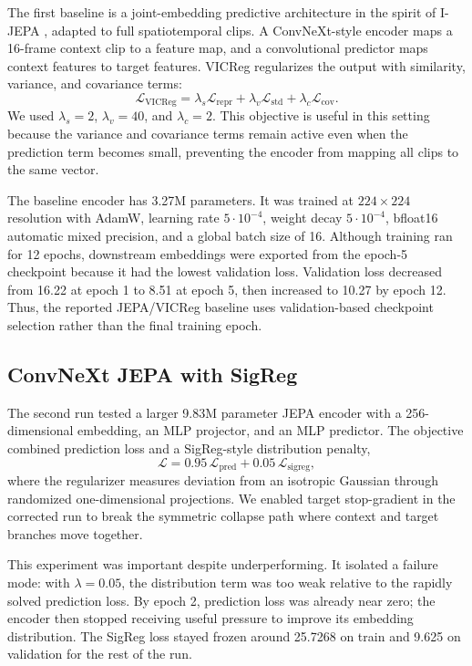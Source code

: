\documentclass{article}
\begin{document}
The first baseline is a joint-embedding predictive architecture in the spirit of I-JEPA \citep{assran2023ijepa}, adapted to full spatiotemporal clips. A ConvNeXt-style encoder maps a 16-frame context clip to a feature map, and a convolutional predictor maps context features to target features. VICReg regularizes the output with similarity, variance, and covariance terms:
\begin{equation}
  \mathcal{L}_{\mathrm{VICReg}}
  = \lambda_s \mathcal{L}_{\mathrm{repr}}
  + \lambda_v \mathcal{L}_{\mathrm{std}}
  + \lambda_c \mathcal{L}_{\mathrm{cov}}.
\end{equation}
We used $\lambda_s=2$, $\lambda_v=40$, and $\lambda_c=2$. This objective is useful in this setting because the variance and covariance terms remain active even when the prediction term becomes small, preventing the encoder from mapping all clips to the same vector.

The baseline encoder has 3.27M parameters. It was trained at $224\times224$ resolution with AdamW, learning rate $5\cdot 10^{-4}$, weight decay $5\cdot 10^{-4}$, bfloat16 automatic mixed precision, and a global batch size of 16. Although training ran for 12 epochs, downstream embeddings were exported from the epoch-5 checkpoint because it had the lowest validation loss. Validation loss decreased from 16.22 at epoch 1 to 8.51 at epoch 5, then increased to 10.27 by epoch 12. Thus, the reported JEPA/VICReg baseline uses validation-based checkpoint selection rather than the final training epoch.

\subsection{ConvNeXt JEPA with SigReg}

The second run tested a larger 9.83M parameter JEPA encoder with a 256-dimensional embedding, an MLP projector, and an MLP predictor. The objective combined prediction loss and a SigReg-style distribution penalty,
\begin{equation}
  \mathcal{L}
  = 0.95\,\mathcal{L}_{\mathrm{pred}}
  + 0.05\,\mathcal{L}_{\mathrm{sigreg}},
\end{equation}
where the regularizer measures deviation from an isotropic Gaussian through randomized one-dimensional projections. We enabled target stop-gradient in the corrected run to break the symmetric collapse path where context and target branches move together.

This experiment was important despite underperforming. It isolated a failure mode: with $\lambda=0.05$, the distribution term was too weak relative to the rapidly solved prediction loss. By epoch 2, prediction loss was already near zero; the encoder then stopped receiving useful pressure to improve its embedding distribution. The SigReg loss stayed frozen around 25.7268 on train and 9.625 on validation for the rest of the run.
\end{document}
